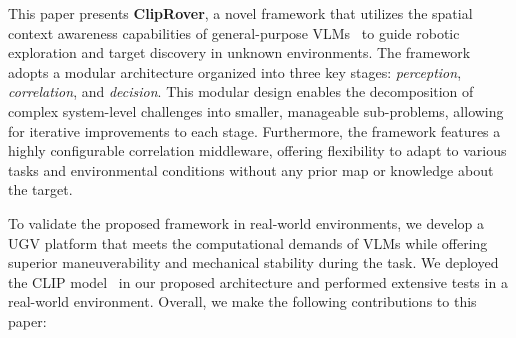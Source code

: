  

This paper presents \textbf{ClipRover}, a novel framework that utilizes the spatial context awareness capabilities of general-purpose VLMs~\cite{chen2024spatialvlm} to guide robotic exploration and target discovery in unknown environments. The framework adopts a modular architecture organized into three key stages: \textit{perception}, \textit{correlation}, and \textit{decision}. This modular design enables the decomposition of complex system-level challenges into smaller, manageable sub-problems, allowing for iterative improvements to each stage. Furthermore, the framework features a highly configurable correlation middleware, offering flexibility to adapt to various tasks and environmental conditions without any prior map or knowledge about the target.




To validate the proposed framework in real-world environments, we develop a UGV platform that meets the computational demands of VLMs while offering superior maneuverability and mechanical stability during the task. We deployed the CLIP model~\cite{radford2021learning,ilharco_gabriel_2021_5143773} in our proposed architecture and performed extensive tests in a real-world environment. Overall, we make the following contributions to this paper:
\vspace{1mm}

